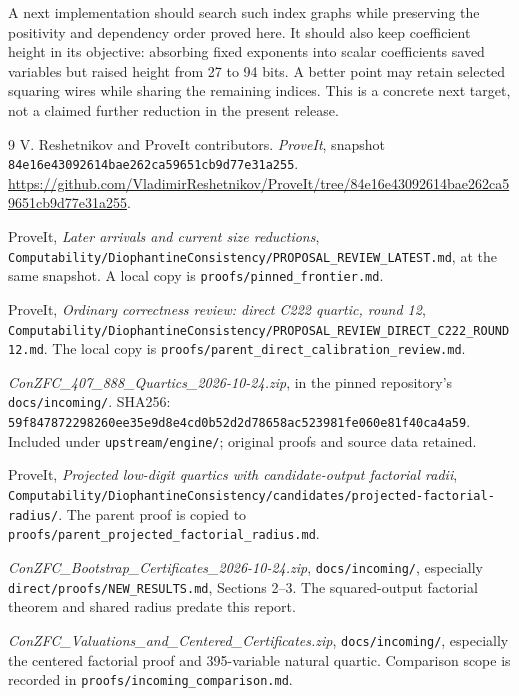 \documentclass[11pt]{article}
\theoremstyle{definition}\newtheorem{definition}[theorem]{Definition}
\newcommand{\file}[1]{\nolinkurl{#1}}
\begin{document}
A next implementation should search such index graphs while preserving
the positivity and dependency order proved here. It should also keep
coefficient height in its objective: absorbing fixed exponents into
scalar coefficients saved variables but raised height from 27 to 94
bits. A better point may retain selected squaring wires while sharing
the remaining indices. This is a concrete next target, not a claimed
further reduction in the present release.

\begin{thebibliography}{9}
 V. Reshetnikov and ProveIt contributors.
\emph{ProveIt}, snapshot
\file{84e16e43092614bae262ca59651cb9d77e31a255}.
\url{https://github.com/VladimirReshetnikov/ProveIt/tree/84e16e43092614bae262ca59651cb9d77e31a255}.

 ProveIt, \emph{Later arrivals and current size reductions},
\file{Computability/DiophantineConsistency/PROPOSAL_REVIEW_LATEST.md},
at the same snapshot. A local copy is \file{proofs/pinned_frontier.md}.

 ProveIt, \emph{Ordinary correctness review: direct C222
quartic, round 12},
\file{Computability/DiophantineConsistency/PROPOSAL_REVIEW_DIRECT_C222_ROUND12.md}.
The local copy is \file{proofs/parent_direct_calibration_review.md}.

 \emph{ConZFC\_407\_888\_Quartics\_2026-10-24.zip},
in the pinned repository's \file{docs/incoming/}. SHA256:
\file{59f847872298260ee35e9d8e4cd0b52d2d78658ac523981fe060e81f40ca4a59}.
Included under \file{upstream/engine/}; original proofs and source data retained.

 ProveIt, \emph{Projected low-digit quartics with
candidate-output factorial radii},
\file{Computability/DiophantineConsistency/candidates/projected-factorial-radius/}.
The parent proof is copied to \file{proofs/parent_projected_factorial_radius.md}.

 \emph{ConZFC\_Bootstrap\_Certificates\_2026-10-24.zip},
\file{docs/incoming/}, especially \file{direct/proofs/NEW_RESULTS.md},
Sections 2--3. The squared-output factorial theorem and shared radius
predate this report.

 \emph{ConZFC\_Valuations\_and\_Centered\_Certificates.zip},
\file{docs/incoming/}, especially the centered factorial proof and
395-variable natural quartic. Comparison scope is recorded in
\file{proofs/incoming_comparison.md}.
\end{thebibliography}
\end{document}
